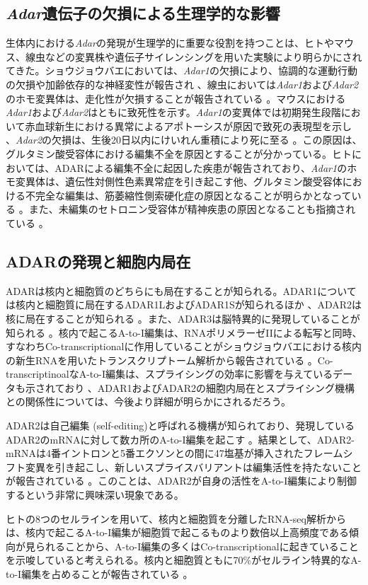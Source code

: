 \subsection{\textit{Adar}遺伝子の欠損による生理学的な影響}
生体内における\textit{Adar}の発現が生理学的に重要な役割を持つことは、ヒトやマウス、線虫などの変異株や遺伝子サイレンシングを用いた実験により明らかにされてきた。ショウジョウバエにおいては、\textit{Adar1}の欠損により、協調的な運動行動の欠損や加齢依存的な神経変性が報告され \citep{PalKeeOCo0008}、線虫においては\textit{Adar1}および\textit{Adar2}のホモ変異体は、走化性が欠損することが報告されている \citep{TonSacMor0211}。マウスにおける\textit{Adar1}および\textit{Adar2}はともに致死性を示す。\textit{Adar1}の変異体では初期発生段階において赤血球新生における異常によるアポトーシスが原因で致死の表現型を示し \citep{HarWalLu0901}、\textit{Adar2}の欠損は、生後20日以内にけいれん重積により死に至る \citep{HigMaaSin0007}。この原因は、グルタミン酸受容体における編集不全を原因とすることが分かっている。ヒトにおいては、ADARによる編集不全に起因した疾患が報告されており、\textit{Adar1}のホモ変異体は、遺伝性対側性色素異常症を引き起こす他、グルタミン酸受容体における不完全な編集は、筋萎縮性側索硬化症の原因となることが明らかとなっている \citep{MiySuzKon0309}。また、未編集のセトロニン受容体が精神疾患の原因となることも指摘されている \citep{Slotkin:2013aa}。

\subsection{ADARの発現と細胞内局在}
ADARは核内と細胞質のどちらにも局在することが知られる。ADAR1については核内と細胞質に局在するADAR1LおよびADAR1Sが知られるほか \citep{PatSam9510}、ADAR2は核に局在することが知られる \citep{DesKeeLaf0305}。また、ADAR3は脳特異的に発現していることが知られる \citep{MelMaaHer9612}。核内で起こるA-to-I編集は、RNAポリメラーゼIIによる転写と同時、すなわちCo-transcriptionalに作用していることがショウジョウバエにおける核内の新生RNAを用いたトランスクリプトーム解析から報告されている \citep{Rodriguez:2012aa}。Co-transcriptinoalなA-to-I編集は、スプライシングの効率に影響を与えているデータも示されており \citep{Laurencikiene:2006aa}、ADAR1およびADAR2の細胞内局在とスプライシング機構との関係性については、今後より詳細が明らかにされるだろう。
\par
ADAR2は自己編集 (self-editing)と呼ばれる機構が知られており、発現しているADAR2のmRNAに対して数カ所のA-to-I編集を起こす \citep{GanZhaYan0611}。結果として、ADAR2-mRNAは4番イントロンと5番エクソンとの間に47塩基が挿入されたフレームシフト変異を引き起こし、新しいスプライスバリアントは編集活性を持たないことが報告されている \citep{HanTohMat0808}。このことは、ADAR2が自身の活性をA-to-I編集により制御するという非常に興味深い現象である。
\par
ヒトの8つのセルラインを用いて、核内と細胞質を分離したRNA-seq解析からは、核内で起こるA-to-I編集が細胞質で起こるものより数倍以上高頻度である傾向が見られることから、A-to-I編集の多くはCo-transcriptionalに起きていることを示唆していると考えられる。核内と細胞質ともに70\%がセルライン特異的なA-to-I編集を占めることが報告されている \citep{Che1307}。

